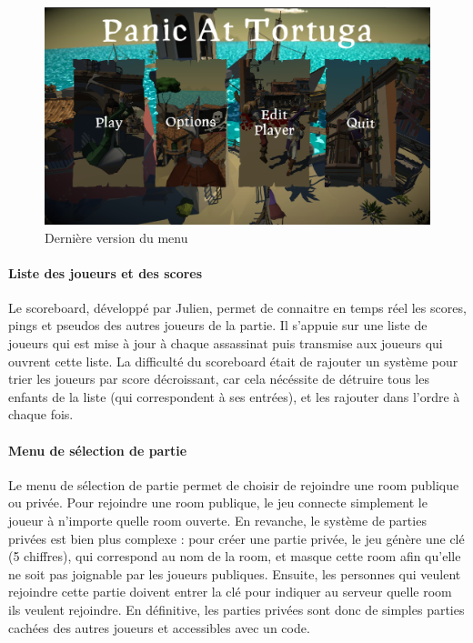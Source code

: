             \begin{figure}[hbt!]
                \centering
                \includegraphics[scale=0.35]{img/menu_principal.png}
                \caption{Dernière version du menu}
            \end{figure}
            \FloatBarrier
        
        \paragraph{Liste des joueurs et des scores}

            Le scoreboard, développé par Julien, permet de connaitre en temps réel les scores, pings et pseudos des autres joueurs de la partie. 
            Il s'appuie sur une liste de joueurs qui est mise à jour à chaque assassinat puis transmise aux joueurs qui ouvrent cette liste. 
            La difficulté du scoreboard était de rajouter un système pour trier les joueurs par score décroissant, car cela nécéssite de 
            détruire tous les enfants de la liste (qui correspondent à ses  entrées), et les rajouter dans l'ordre à chaque fois.

        \paragraph{Menu de sélection de partie}

            Le menu de sélection de partie permet de choisir de rejoindre une room publique ou privée. Pour rejoindre une room publique, le jeu 
            connecte simplement le joueur à n'importe quelle room ouverte. En revanche, le système de parties privées est bien plus complexe :
            pour créer une partie privée, le jeu génère une clé (5 chiffres), qui correspond au nom de la room, et masque cette room afin qu'elle 
            ne soit pas joignable par les joueurs publiques. Ensuite, les personnes qui veulent rejoindre cette partie doivent entrer la clé pour 
            indiquer au serveur quelle room ils veulent rejoindre. En définitive, les parties privées sont donc de simples parties cachées des autres 
            joueurs et accessibles avec un code.

        